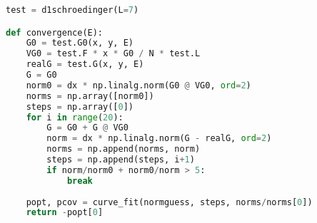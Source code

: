 \begin{lstlisting}[language=Python]
test = d1schroedinger(L=7)

def convergence(E):
    G0 = test.G0(x, y, E)
    VG0 = test.F * x * G0 / N * test.L
    realG = test.G(x, y, E)
    G = G0
    norm0 = dx * np.linalg.norm(G0 @ VG0, ord=2)
    norms = np.array([norm0])
    steps = np.array([0])
    for i in range(20):
        G = G0 + G @ VG0
        norm = dx * np.linalg.norm(G - realG, ord=2)
        norms = np.append(norms, norm)
        steps = np.append(steps, i+1)
        if norm/norm0 + norm0/norm > 5:
            break
    
    popt, pcov = curve_fit(normguess, steps, norms/norms[0])
    return -popt[0]
\end{lstlisting}